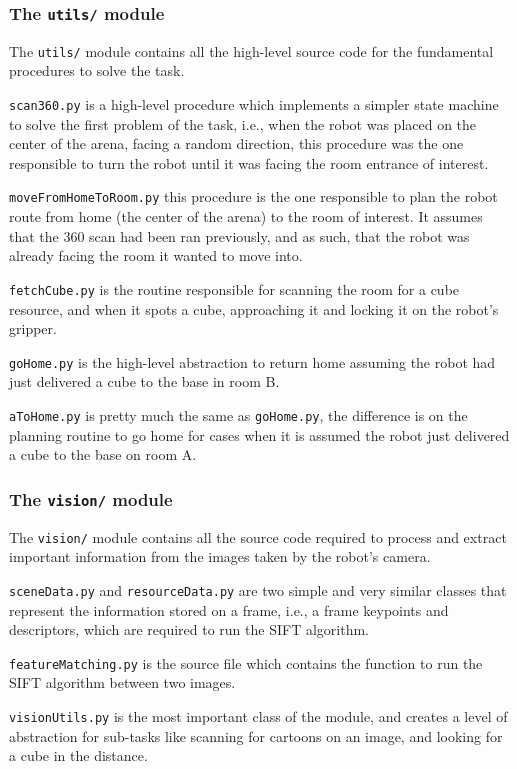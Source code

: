 
\subsubsection{The \texttt{utils/} module}

The \texttt{utils/} module contains all the high-level source code for the fundamental procedures to solve the task.

\texttt{scan360.py} is a high-level procedure which implements a simpler state machine to solve the first problem of the task, i.e., when the robot was placed on the center of the arena, facing a random direction, this procedure was the one responsible to turn the robot until it was facing the room entrance of interest.

\texttt{moveFromHomeToRoom.py} this procedure is the one responsible to plan the robot route from home (the center of the arena) to the room of interest. It assumes that the 360 scan had been ran previously, and as such, that the robot was already facing the room it wanted to move into.

\texttt{fetchCube.py} is the routine responsible for scanning the room for a cube resource, and when it spots a cube, approaching it and locking it on the robot's gripper.

\texttt{goHome.py} is the high-level abstraction to return home assuming the robot had just delivered a cube to the base in room B.

\texttt{aToHome.py} is pretty much the same as \texttt{goHome.py}, the difference is on the planning routine to go home for cases when it is assumed the robot just delivered a cube to the base on room A.


\subsubsection{The \texttt{vision/} module}

The \texttt{vision/} module contains all the source code required to process and extract important information from the images taken by the robot's camera.

\texttt{sceneData.py} and \texttt{resourceData.py} are two simple and very similar classes that represent the information stored on a frame, i.e., a frame keypoints and descriptors, which are required to run the SIFT algorithm.

\texttt{featureMatching.py} is the source file which contains the function to run the SIFT algorithm between two images.

\texttt{visionUtils.py} is the most important class of the module, and creates a level of abstraction for sub-tasks like scanning for cartoons on an image, and looking for a cube in the distance.

\newpage
